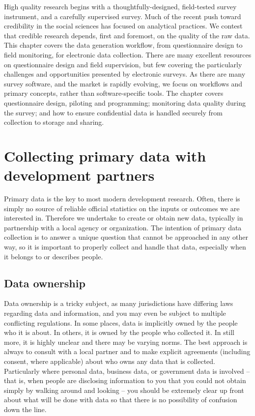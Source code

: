 
\begin{fullwidth}
High quality research begins with a thoughtfully-designed, field-tested survey instrument, and a carefully supervised survey.
Much of the recent push toward credibility in the social sciences has focused on analytical practices.
We contest that credible research depends, first and foremost, on the quality of the raw data. This chapter covers the data generation workflow, from questionnaire design to field monitoring, for electronic data collection.
There are many excellent resources on questionnaire design and field supervision,
but few covering the particularly challenges and opportunities presented by electronic surveys.
As there are many survey software, and the market is rapidly evolving, we focus on workflows and primary concepts, rather than software-specific tools.
The chapter covers questionnaire design, piloting and programming; monitoring data quality during the survey; and how to ensure confidential data is handled securely from collection to storage and sharing.


\end{fullwidth}

\section{Collecting primary data with development partners}

Primary data is the key to most modern development research.
Often, there is simply no source of reliable official statistics
on the inputs or outcomes we are interested in.
Therefore we undertake to create or obtain new data,
typically in partnership with a local agency or organization.
The intention of primary data collection
is to answer a unique question that cannot be approached in any other way,
so it is important to properly collect and handle that data,
especially when it belongs to or describes people.

\subsection{Data ownership}

Data ownership is a tricky subject,
as many jurisdictions have differing laws regarding data and information,
and you may even be subject to multiple conflicting regulations.
In some places, data is implicitly owned by the people who it is about.
In others, it is owned by the people who collected it.
In still more, it is highly unclear and there may be varying norms.
The best approach is always to consult with a local partner
and to make explicit agreements (including consent, where applicable)
about who owns any data that is collected.
Particularly where personal data, business data, or government data is involved
-- that is, when people are disclosing information to you
that you could not obtain simply by walking around and looking --
you should be extremely clear up front about what will be done with data
so that there is no possibility of confusion down the line.

